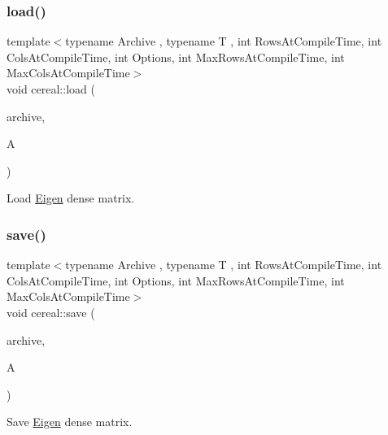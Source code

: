 \subsubsection{\texorpdfstring{load()}{load()}}
{\footnotesize\ttfamily template$<$typename Archive , typename T , int Rows\+At\+Compile\+Time, int Cols\+At\+Compile\+Time, int Options, int Max\+Rows\+At\+Compile\+Time, int Max\+Cols\+At\+Compile\+Time$>$ \\
void cereal\+::load (\begin{DoxyParamCaption}\item[{Archive \&}]{archive,  }\item[{Eigen\+::\+Matrix$<$ T, Rows\+At\+Compile\+Time, Cols\+At\+Compile\+Time, Options, Max\+Rows\+At\+Compile\+Time, Max\+Cols\+At\+Compile\+Time $>$ \&}]{A }\end{DoxyParamCaption})}



Load \hyperlink{namespaceEigen}{Eigen} dense matrix. 

\mbox{\label{namespacecereal_afd0f4831f36c8d183e4ff80c96b6b9ed}} 
\subsubsection{\texorpdfstring{save()}{save()}}
{\footnotesize\ttfamily template$<$typename Archive , typename T , int Rows\+At\+Compile\+Time, int Cols\+At\+Compile\+Time, int Options, int Max\+Rows\+At\+Compile\+Time, int Max\+Cols\+At\+Compile\+Time$>$ \\
void cereal\+::save (\begin{DoxyParamCaption}\item[{Archive \&}]{archive,  }\item[{const Eigen\+::\+Matrix$<$ T, Rows\+At\+Compile\+Time, Cols\+At\+Compile\+Time, Options, Max\+Rows\+At\+Compile\+Time, Max\+Cols\+At\+Compile\+Time $>$ \&}]{A }\end{DoxyParamCaption})}



Save \hyperlink{namespaceEigen}{Eigen} dense matrix. 

